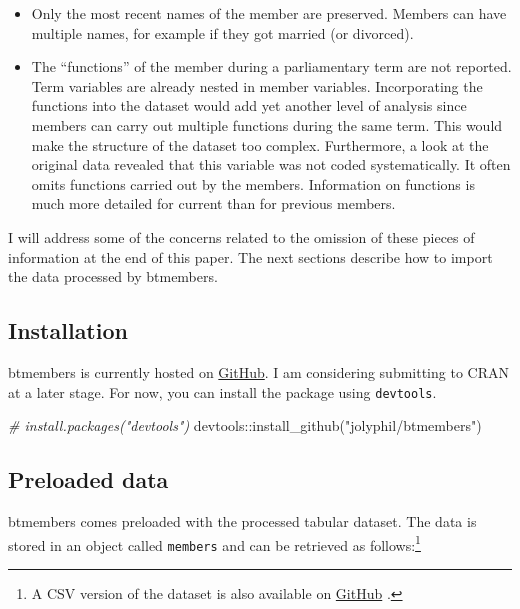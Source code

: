 \documentclass[12pt]{article}
\providecommand{\tightlist}{%
  \setlength{\itemsep}{0pt}\setlength{\parskip}{0pt}}
\newenvironment{Shaded}{\begin{snugshade}}{\end{snugshade}}
\newcommand{\CommentTok}[1]{\textcolor[rgb]{0.56,0.35,0.01}{\textit{#1}}}
\newcommand{\FunctionTok}[1]{\textcolor[rgb]{0.00,0.00,0.00}{#1}}
\newcommand{\NormalTok}[1]{#1}
\newcommand{\SpecialCharTok}[1]{\textcolor[rgb]{0.00,0.00,0.00}{#1}}
\newcommand{\StringTok}[1]{\textcolor[rgb]{0.31,0.60,0.02}{#1}}
\begin{document}
\begin{itemize}
\tightlist
\item
  Only the most recent names of the member are preserved. Members can
  have multiple names, for example if they got married (or divorced).
\item
  The ``functions'' of the member during a parliamentary term are not
  reported. Term variables are already nested in member variables.
  Incorporating the functions into the dataset would add yet another
  level of analysis since members can carry out multiple functions
  during the same term. This would make the structure of the dataset too
  complex. Furthermore, a look at the original data revealed that this
  variable was not coded systematically. It often omits functions
  carried out by the members. Information on functions is much more
  detailed for current than for previous members.
\end{itemize}

I will address some of the concerns related to the omission of these
pieces of information at the end of this paper. The next sections
describe how to import the data processed by btmembers.

\hypertarget{installation}{%
\subsection{Installation}\label{installation}}

btmembers is currently hosted on
\href{https://github.com/jolyphil/btmembers}{GitHub}. I am considering
submitting to CRAN at a later stage. For now, you can install the
package using \texttt{devtools}.

\begin{Shaded}
\begin{Highlighting}[]
\CommentTok{\# install.packages("devtools")}
\NormalTok{devtools}\SpecialCharTok{::}\FunctionTok{install\_github}\NormalTok{(}\StringTok{"jolyphil/btmembers"}\NormalTok{)}
\end{Highlighting}
\end{Shaded}

\hypertarget{preloaded-data}{%
\subsection{Preloaded data}\label{preloaded-data}}

btmembers comes preloaded with the processed tabular dataset. The data
is stored in an object called \texttt{members} and can be retrieved as
follows:\footnote{A CSV version of the dataset is also available on
  \href{https://github.com/jolyphil/btmembers/blob/master/csv/}{GitHub}
  .}
\end{document}
